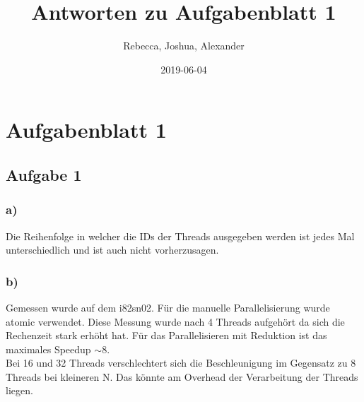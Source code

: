 \documentclass{article}
\title{Antworten zu Aufgabenblatt 1}
\date{2019-06-04}
\author{Rebecca, Joshua, Alexander}
\begin{document}
    \maketitle
    \newpage
    \section{Aufgabenblatt 1}
    \subsection{Aufgabe 1}
        \subsubsection{a)}
        Die Reihenfolge in welcher die IDs der Threads ausgegeben werden ist jedes Mal unterschiedlich und ist auch nicht vorherzusagen.
        
        \subsubsection{b)}
        Gemessen wurde auf dem i82sn02. Für die manuelle Parallelisierung wurde atomic verwendet. Diese Messung wurde nach 4 Threads aufgehört da sich die Rechenzeit stark erhöht hat. Für das Parallelisieren mit Reduktion ist das maximales Speedup $ \sim 8 $.\\
        Bei 16 und 32 Threads verschlechtert sich die Beschleunigung im Gegensatz zu 8 Threads bei kleineren N. Das könnte am Overhead der Verarbeitung der Threads liegen.
        
\end{document}
